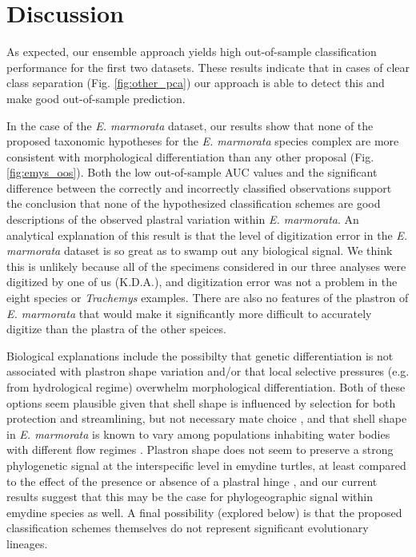 \documentclass[fleqn,10pt,lineno]{wlpeerj} %
\begin{document}
\section*{Discussion}


As expected, our ensemble approach yields high out-of-sample classification performance for the first two datasets. These results indicate that in cases of clear class separation (Fig. \ref{fig:other_pca}) our approach is able to detect this and make good out-of-sample prediction.

In the case of the \textit{E. marmorata} dataset, our results show that none of the proposed taxonomic hypotheses for the \textit{E. marmorata} species complex are more consistent with morphological differentiation than any other proposal (Fig. \ref{fig:emys_oos}). Both the low out-of-sample AUC values and the significant difference between the correctly and incorrectly classified observations support the conclusion that none of the hypothesized classification schemes are good descriptions of the observed plastral variation within \textit{E. marmorata}. An analytical explanation of this result is that the level of digitization error in the \textit{E. marmorata} dataset is so great as to swamp out any biological signal. We think this is unlikely because all of the specimens considered in our three analyses were digitized by one of us (K.D.A.), and digitization error was not a problem in the eight species or \textit{Trachemys} examples. There are also no features of the plastron of \textit{E. marmorata} that would make it significantly more difficult to accurately digitize than the plastra of the other speices.

Biological explanations include the possibilty that genetic differentiation is not associated with plastron shape variation and/or that local selective pressures (e.g. from hydrological regime) overwhelm morphological differentiation. Both of these options seem plausible given that shell shape is influenced by selection for both protection and streamlining, but not necessary mate choice \citep{Rivera2008,Rivera2011,Stayton2011,Rivera2014,Polly2016}, and that shell shape in \textit{E. marmorata} is known to vary among populations inhabiting water bodies with different flow regimes \citep{Holland1992,Lubcke2007,Germano2009}. Plastron shape does not seem to preserve a strong phylogenetic signal at the interspecific level in emydine turtles, at least compared to the effect of the presence or absence of a plastral hinge \citep{Angielczyk2011}, and our current results suggest that this may be the case for phylogeographic signal within emydine species as well. A final possibility (explored below) is that the proposed classification schemes themselves do not represent significant evolutionary lineages.
\end{document}
